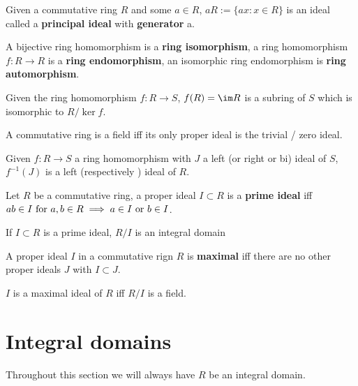 \documentclass[../Year2.tex]{subfiles}
\begin{document}
\begin{definition}
    Given a commutative ring $R$ and some $a\in R$, $aR:= \{ax:x\in R\}$ is an ideal called a \textbf{principal ideal} with \textbf{generator} a.
\end{definition}

\begin{definition}
    A bijective ring homomorphism is a \textbf{ring isomorphism}, a ring homomorphism $f:R\rightarrow R$ is a \textbf{ring endomorphism}, an isomorphic ring endomorphism is \textbf{ring automorphism}.
\end{definition}

\begin{proposition}
    Given the ring homomorphism $f:R\rightarrow S$, $f(R)=\im R$ is a subring of $S$ which is isomorphic to $R/\ker f$.
\end{proposition}

\begin{proposition}
    A commutative ring is a field iff its only proper ideal is the trivial / zero ideal.
\end{proposition}

\begin{proposition}
    Given $f:R\rightarrow S$ a ring homomorphism with $J$ a left (or right or bi) ideal of $S$, $f^{-1}(J)$ is a left (respectively ) ideal of $R$.
\end{proposition}

\begin{definition}
    Let $R$ be a commutative ring, a proper ideal $I\subset R$ is a \textbf{prime ideal} iff $ab\in I \ \text{\textcolor{black}{for }} a,b\in R \implies a\in I \ \text{\textcolor{black}{or }} b\in I$.
\end{definition}

\begin{theorem}
    If $I\subset R$ is a prime ideal, $R/I$ is an integral domain
\end{theorem}

\begin{definition}
    A proper ideal $I$ in a commutative rign $R$ is \textbf{maximal} iff there are no other proper ideals $J$ with $I\subset J$.
\end{definition}

\begin{theorem}
    $I$ is a maximal ideal of $R$ iff $R/I$ is a field.
\end{theorem}

\section{Integral domains}
Throughout this section we will always have $R$ be an integral domain.
\end{document}
